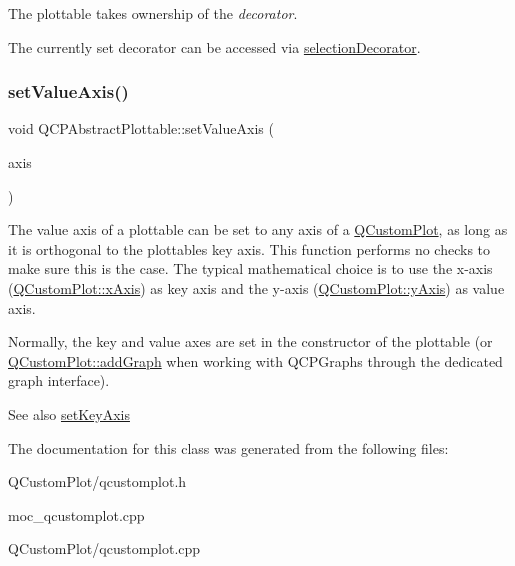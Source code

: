 The plottable takes ownership of the {\itshape decorator}.

The currently set decorator can be accessed via \mbox{\hyperlink{class_q_c_p_abstract_plottable_a7861518e47ca0c6a0c386032c2db075e}{selection\+Decorator}}. \mbox{\label{class_q_c_p_abstract_plottable_a71626a07367e241ec62ad2c34baf21cb}} 
\subsubsection{\texorpdfstring{set\+Value\+Axis()}{setValueAxis()}}
{\footnotesize\ttfamily void Q\+C\+P\+Abstract\+Plottable\+::set\+Value\+Axis (\begin{DoxyParamCaption}\item[{\mbox{\hyperlink{class_q_c_p_axis}{Q\+C\+P\+Axis}} $\ast$}]{axis }\end{DoxyParamCaption})}

The value axis of a plottable can be set to any axis of a \mbox{\hyperlink{class_q_custom_plot}{Q\+Custom\+Plot}}, as long as it is orthogonal to the plottable\textquotesingle{}s key axis. This function performs no checks to make sure this is the case. The typical mathematical choice is to use the x-\/axis (\mbox{\hyperlink{class_q_custom_plot_a9a79cd0158a4c7f30cbc702f0fd800e4}{Q\+Custom\+Plot\+::x\+Axis}}) as key axis and the y-\/axis (\mbox{\hyperlink{class_q_custom_plot_af6fea5679725b152c14facd920b19367}{Q\+Custom\+Plot\+::y\+Axis}}) as value axis.

Normally, the key and value axes are set in the constructor of the plottable (or \mbox{\hyperlink{class_q_custom_plot_a6fb2873d35a8a8089842d81a70a54167}{Q\+Custom\+Plot\+::add\+Graph}} when working with Q\+C\+P\+Graphs through the dedicated graph interface).

\begin{DoxySeeAlso}{See also}
\mbox{\hyperlink{class_q_c_p_abstract_plottable_a8524fa2994c63c0913ebd9bb2ffa3920}{set\+Key\+Axis}} 
\end{DoxySeeAlso}


The documentation for this class was generated from the following files\+:\begin{DoxyCompactItemize}
\item 
Q\+Custom\+Plot/qcustomplot.\+h\item 
moc\+\_\+qcustomplot.\+cpp\item 
Q\+Custom\+Plot/qcustomplot.\+cpp\end{DoxyCompactItemize}
